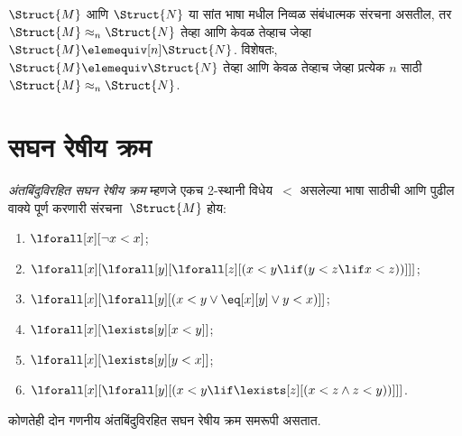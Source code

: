 \begin{cor}\label{mod:bas:pis:cor:b-n-f}
  $\Struct{M}$ आणि $\Struct{N}$ या सांत भाषा मधील निव्वळ
  संबंधात्मक संरचना असतील, तर $\Struct{M} \approx_n\Struct{N}$
  तेव्हा आणि केवळ तेव्हाच जेव्हा $\Struct{M} \elemequiv[n] \Struct{N}$.
  विशेषतः, $\Struct{M} \elemequiv \Struct{N}$ तेव्हा आणि केवळ तेव्हाच
  जेव्हा प्रत्येक $n$ साठी $\Struct{M} \approx_n \Struct{N}$.
\end{cor}











\section{सघन रेषीय क्रम}\label{mod:bas:dlo:sec}

\begin{defn}
  \emph{अंतबिंदुविरहित सघन रेषीय क्रम} म्हणजे एकच 2-स्थानी
  विधेय~$<$ असलेल्या भाषा साठीची आणि पुढील वाक्ये पूर्ण
  करणारी संरचना~$\Struct{M}$ होय:
  \begin{enumerate}
  \item $\lforall[x][\lnot x < x]$;
  \item $\lforall[x][\lforall[y][\lforall[z][(x < y \lif (y < z \lif x
    <z ))]]]$;
  \item $\lforall[x][\lforall[y][(x< y \lor \eq[x][y] \lor y < x)]]$;
  \item $\lforall[x][\lexists[y][x < y]]$;
  \item $\lforall[x][\lexists[y][y < x]]$;
  \item $\lforall[x][\lforall[y][(x < y \lif \lexists[z][(x < z \land
        z < y))]]]$.
 \end{enumerate}
\end{defn}

\begin{thm}\label{mod:bas:dlo:thm:cantorQ}
  कोणतेही दोन गणनीय अंतबिंदुविरहित सघन रेषीय क्रम समरूपी
  असतात.
\end{thm}

